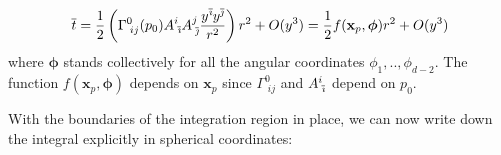 \documentclass[12pt]{article}
\newcommand{\be}{\begin{equation}}
\newcommand{\ee}{\end{equation}}
\newcommand{\ibar}{{\overline{\emph\i}}}
\newcommand{\jbar}{{\overline{\emph\j}}}
\begin{document}
\be\label{eq:RadialBottomSurface}
\overline{t}=\frac{1}{2}\left(\Gamma^{0}_{\;ij}(p_0)A^{i}_{\;\ibar}A^{j}_{\;\jbar}\frac{y^{\ibar} y^{\jbar}}{r^2}\right)r^2+O(y^3)=\frac{1}{2}f(\mathbf{x}_p,{\boldsymbol\phi})r^2+O(y^3)
\ee
where $\boldsymbol\phi$ stands collectively for all the angular coordinates $\phi_1,..,\phi_{d-2}$. The function $f(\mathbf{x}_p,\boldsymbol\phi)$ depends on $\mathbf{x}_p$ since $\Gamma^{0}_{\;ij}$ and $A^{i}_{\;\ibar}$ depend on $p_0$.

With the boundaries of the integration region in place, we can now write down the integral explicitly in spherical coordinates:
\end{document}

